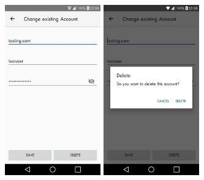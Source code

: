 \documentclass{beamer}
\begin{document}
\begin{frame}{}
\vfill
\centering
\includegraphics[width=0.31\textwidth]{images/ChangeAccountActivity.jpg}
\hspace{1cm}
\includegraphics[width=0.31\textwidth]{images/DeleteAccount.jpg}
\vfill
%
\note{
}
\end{frame}
\end{document}
